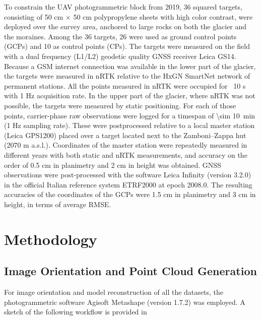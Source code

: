 To constrain the UAV photogrammetric block from 2019, 36 squared targets, consisting
of 50 cm × 50 cm polypropylene sheets with high color contrast, were deployed over the
survey area, anchored to large rocks on both the glacier and the moraines. Among the
36 targets, 26 were used as ground control points (GCPs) and 10 as control points (CPs).
The targets were measured on the field with a dual frequency (L1/L2) geodetic quality
GNSS receiver Leica GS14. Because a GSM internet connection was available in the lower
part of the glacier, the targets were measured in nRTK relative to the HxGN SmartNet
network of permanent stations. All the points measured in nRTK were occupied for ~10 s
with 1 Hz acquisition rate. In the upper part of the glacier, where nRTK was not possible,
the targets were measured by static positioning. For each of those points, carrier-phase
raw observations were logged for a timespan of \SI{\sim 10}{\minute} (1 Hz sampling rate).
These were postprocessed relative to a local master station (Leica GPS1200) placed 
over a target located next to the Zamboni–Zappa hut (2070 m a.s.l.). 
Coordinates of the master station were repeatedly measured in different years with both
static and nRTK measurements, and accuracy on the order of 0.5 cm in planimetry and 2 cm 
in height was obtained. 
GNSS observations were post-processed with the software Leica Infinity (version 3.2.0) in the
official Italian reference system ETRF2000 at epoch 2008.0. The resulting accuracies of
the coordinates of the GCPs were 1.5 cm in planimetry and 3 cm in height, in terms of
average RMSE.

\section{Methodology}\label{sec:2:methods}

\subsection{Image Orientation and Point Cloud Generation}

For image orientation and model reconstruction of all the datasets, the photogrammetric software Agisoft Metashape (version 1.7.2) was employed. A sketch of the following
workflow is provided in 

